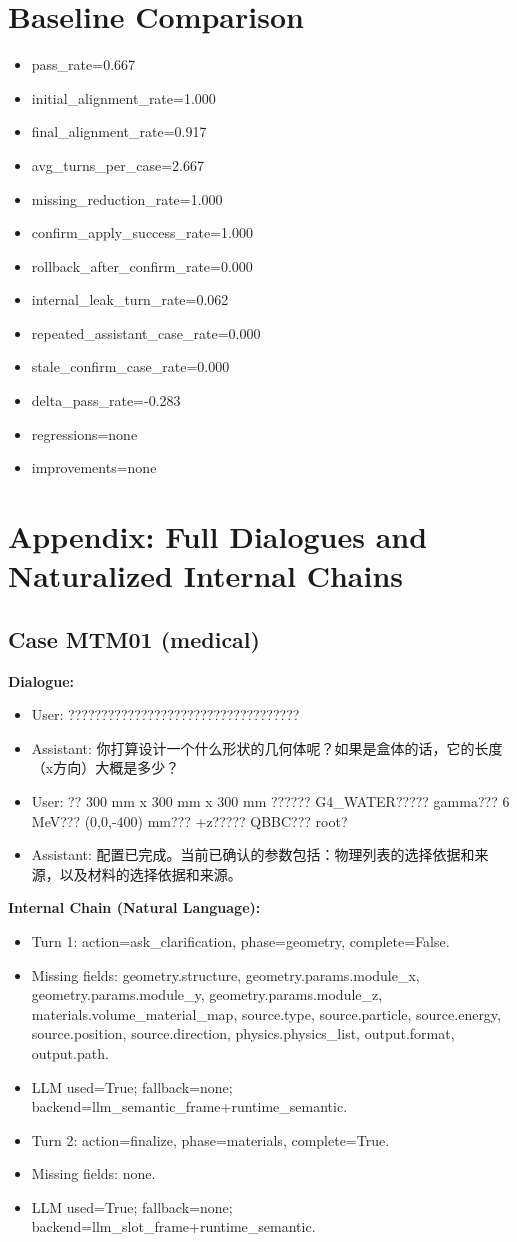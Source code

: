 \documentclass[11pt]{ctexart}
\begin{document}
\section{Baseline Comparison}
\begin{itemize}
\item pass\_rate=0.667
\item initial\_alignment\_rate=1.000
\item final\_alignment\_rate=0.917
\item avg\_turns\_per\_case=2.667
\item missing\_reduction\_rate=1.000
\item confirm\_apply\_success\_rate=1.000
\item rollback\_after\_confirm\_rate=0.000
\item internal\_leak\_turn\_rate=0.062
\item repeated\_assistant\_case\_rate=0.000
\item stale\_confirm\_case\_rate=0.000
\item delta\_pass\_rate=-0.283
\item regressions=none
\item improvements=none
\end{itemize}
\appendix
\section{Appendix: Full Dialogues and Naturalized Internal Chains}
\subsection{Case MTM01 (medical)}
\textbf{Dialogue:}
\begin{itemize}
\item User: ???????????????????????????????????
\item Assistant: 你打算设计一个什么形状的几何体呢？如果是盒体的话，它的长度（x方向）大概是多少？
\item User: ?? 300 mm x 300 mm x 300 mm ?????? G4\_WATER????? gamma??? 6 MeV??? (0,0,-400) mm??? +z????? QBBC??? root?
\item Assistant: 配置已完成。当前已确认的参数包括：物理列表的选择依据和来源，以及材料的选择依据和来源。
\end{itemize}
\textbf{Internal Chain (Natural Language):}
\begin{itemize}
\item Turn 1: action=ask\_clarification, phase=geometry, complete=False.
\item Missing fields: geometry.structure, geometry.params.module\_x, geometry.params.module\_y, geometry.params.module\_z, materials.volume\_material\_map, source.type, source.particle, source.energy, source.position, source.direction, physics.physics\_list, output.format, output.path.
\item LLM used=True; fallback=none; backend=llm\_semantic\_frame+runtime\_semantic.
\item Turn 2: action=finalize, phase=materials, complete=True.
\item Missing fields: none.
\item LLM used=True; fallback=none; backend=llm\_slot\_frame+runtime\_semantic.
\end{itemize}
\end{document}
